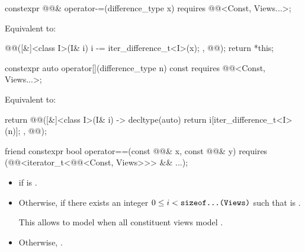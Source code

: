 %
\begin{itemdecl}
constexpr @@& operator-=(difference_type x)
  requires @@<Const, Views...>;
\end{itemdecl}

\begin{itemdescr}
\pnum
\effects
Equivalent to:
\begin{codeblock}
@@([&]<class I>(I& i) { i -= iter_difference_t<I>(x); }, @@);
return *this;
\end{codeblock}
\end{itemdescr}

%
\begin{itemdecl}
constexpr auto operator[](difference_type n) const
  requires @@<Const, Views...>;
\end{itemdecl}

\begin{itemdescr}
\pnum
\effects
Equivalent to:
\begin{codeblock}
return @@([&]<class I>(I& i) -> decltype(auto) {
  return i[iter_difference_t<I>(n)];
}, @@);
\end{codeblock}
\end{itemdescr}

%
\begin{itemdecl}
friend constexpr bool operator==(const @@& x, const @@& y)
  requires (@@<iterator_t<@@<Const, Views>>> && ...);
\end{itemdecl}

\begin{itemdescr}
\pnum
\returns
\begin{itemize}
\item
{}
if  is .
\item
Otherwise, 
if there exists an integer $0 \leq i < \tcode{sizeof...(Views)}$
such that  is .
\begin{note}
This allows  to model 
when all constituent views model .
\end{note}
\item
Otherwise, .
\end{itemize}
\end{itemdescr}

